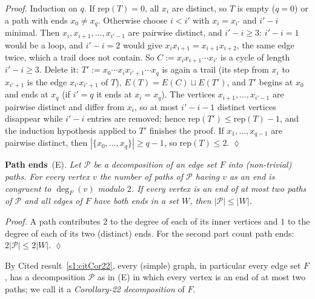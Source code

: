\emph{Proof.} Induction on $q$. If $\mathrm{rep}(T)=0$, all $x_i$ are distinct, so $T$ is empty ($q=0$) or a path with ends
$x_0\ne x_q$. Otherwise choose $i<i'$ with $x_i=x_{i'}$ and $i'-i$ minimal. Then $x_i,x_{i+1},\dots,x_{i'-1}$ are pairwise
distinct, and $i'-i\ge3$: $i'-i=1$ would be a loop, and $i'-i=2$ would give $x_ix_{i+1}=x_{i+1}x_{i+2}$, the same
edge twice, which a trail does not contain. So $C:=x_ix_{i+1}\cdots x_{i'}$ is a cycle of length $i'-i\ge3$. Delete it:
$T':=x_0\cdots x_ix_{i'+1}\cdots x_q$ is again a trail (its step from $x_i$ to $x_{i'+1}$ is the edge $x_{i'}x_{i'+1}$ of
$T$), $E(T)=E(C)\sqcup E(T')$, and $T'$ begins at $x_0$ and ends at $x_q$ (if $i'=q$ it ends at $x_i=x_q$). The
vertices $x_{i+1},\dots,x_{i'-1}$ are pairwise distinct and differ from $x_i$, so at most $i'-i-1$ distinct vertices
disappear while $i'-i$ entries are removed; hence $\mathrm{rep}(T')\le\mathrm{rep}(T)-1$, and the induction hypothesis applied to
$T'$ finishes the proof. If $x_1,\dots,x_{q-1}$ are pairwise distinct, then $|\{x_0,\dots,x_q\}|\ge q-1$, so
$\mathrm{rep}(T)\le2$. \hfill$\lozenge$

\smallskip\noindent\textbf{Path ends}~\textup{(E)}.
\emph{Let $\mathcal P$ be a decomposition of an edge set $F$ into (non-trivial) paths. For every vertex $v$ the number
of paths of $\mathcal P$ having $v$ as an end is congruent to $\deg_F(v)$ modulo $2$. If every vertex is an end of at
most two paths of $\mathcal P$ and all edges of $F$ have both ends in a set $W$, then $|\mathcal P|\le|W|$.}

\emph{Proof.} A path contributes $2$ to the degree of each of its inner vertices and $1$ to the degree of each of its
two (distinct) ends. For the second part count path ends: $2|\mathcal P|\le2|W|$. \hfill$\lozenge$

\noindent By Cited result~\ref{s1:citCor22}, every (simple) graph, in particular every edge set $F$, has a
decomposition $\mathcal P$ as in (E) in which every vertex is an end of at most two paths; we call it a
\emph{Corollary-22 decomposition} of $F$.

